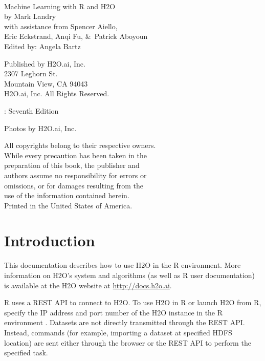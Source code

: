 {\raggedright\vfill\

Machine Learning with R and H2O\\

  by Mark Landry\\
  with assistance from Spencer Aiello, \\ 
  Eric Eckstrand, Anqi Fu, \&\ Patrick Aboyoun\\
Edited by: Angela Bartz

\bigskip
Published by H2O.ai, Inc. \\
2307 Leghorn St. \\
Mountain View, CA 94043\\
\bigskip
\textcopyright \the\year \hspace{1pt} H2O.ai, Inc. All Rights Reserved.
\bigskip

\monthname \hspace{1pt}  \the\year: Seventh Edition
\bigskip

Photos by \textcopyright H2O.ai, Inc.
\bigskip

All copyrights belong to their respective owners.\\
While every precaution has been taken in the\\
preparation of this book, the publisher and\\
authors assume no responsibility for errors or\\
omissions, or for damages resulting from the\\
use of the information contained herein.\\
\bigskip
Printed in the United States of America.




\newpage
\thispagestyle{empty}%
\tableofcontents
\thispagestyle{empty}%


\newpage


\section{Introduction}

This documentation describes how to use H2O in the R environment. More information on H2O's system and algorithms (as well as R user documentation) is available at the H2O website at {\url{http://docs.h2o.ai}}.

R uses a REST API to connect to H2O. To use H2O in R or launch H2O from R, specify the IP address and port number of the H2O instance in the R environment . Datasets are not directly transmitted through the REST API. Instead, commands (for example, importing a dataset at specified HDFS location) are sent either through the browser or the REST API to perform the specified task.

}
